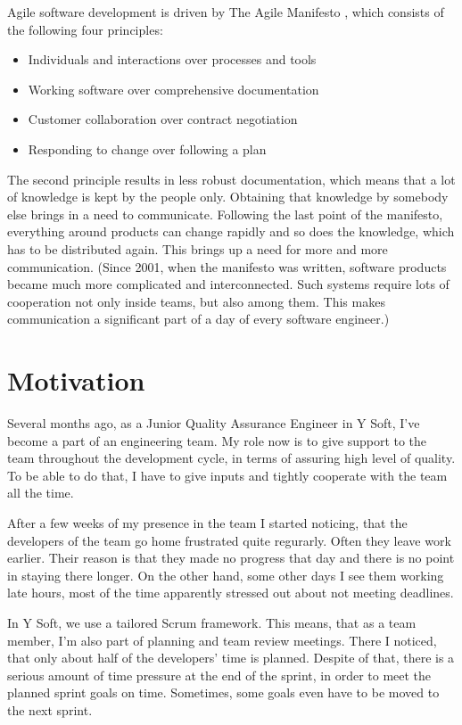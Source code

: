 \documentclass[11pt,singleside]{myfithesis2}
\begin{document}
Agile software development is driven by The Agile Manifesto \cite{agileManifesto}, which consists of the following four principles:
\begin{itemize}
	\item Individuals and interactions over processes and tools
	\item Working software over comprehensive documentation
	\item Customer collaboration over contract negotiation
	\item Responding to change over following a plan 
\end{itemize}
The second principle results in less robust documentation, which means that a lot of knowledge is kept by the people only. Obtaining that knowledge by somebody else brings in a need to communicate. Following the last point of the manifesto, everything around products can change rapidly and so does the knowledge, which has to be distributed again. This brings up a need for more and more communication. 
(Since 2001, when the manifesto was written, software products became much more complicated and interconnected. Such systems require lots of cooperation not only inside teams, but also among them. This makes communication a significant part of a day of every software engineer.)


	\section{Motivation}
Several months ago, as a Junior Quality Assurance Engineer in Y Soft, I've become a part of an engineering team. My role now is to give support to the team throughout the development cycle, in terms of assuring high level of quality. To be able to do that, I have to give inputs and tightly cooperate with the team all the time. 

After a few weeks of my presence in the team I started noticing, that the developers of the team go home frustrated quite regurarly. Often they leave work earlier. Their reason is that they made no progress that day and there is no point in staying there longer. On the other hand, some other days I see them working late hours, most of the time apparently stressed out about not meeting deadlines.

In Y Soft, we use a tailored Scrum framework. This means, that as a team member, I'm also part of planning and team review meetings. There I noticed, that only about half of the developers' time is planned. Despite of that, there is a serious amount of time pressure at the end of the sprint, in order to meet the planned sprint goals on time. Sometimes, some goals even have to be moved to the next sprint.
\end{document}
